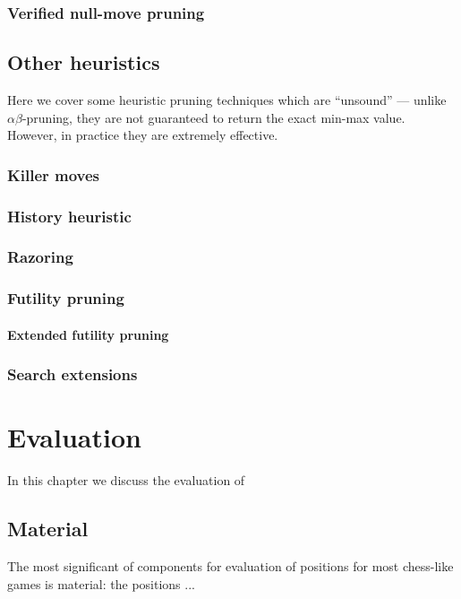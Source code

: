 \documentclass[10pt,dvipdfmx,letterpaper]{report}
\newcommand{\ab}{{$\alpha\beta$}}
\begin{document}
\subsection{Verified null-move pruning}

\section{Other heuristics}
Here we cover some heuristic pruning techniques which are ``unsound'' --- unlike
\ab-pruning, they are not guaranteed to return the exact min-max value.  However,
in practice they are extremely effective.
\subsection{Killer moves}
\subsection{History heuristic}
\subsection{Razoring}
\subsection{Futility pruning}
\subsubsection{Extended futility pruning}
\subsection{Search extensions}

\chapter{Evaluation}
\label{chap-evaluation}

In this chapter we discuss the evaluation of

\section{Material}
The most significant of components for evaluation
of positions for most chess-like games is material:
the positions ...
\end{document}
